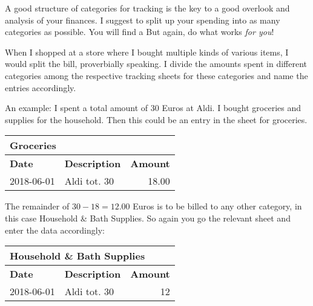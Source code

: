 A good structure of categories for tracking is the key to a good overlook and analysis of your finances.
I suggest to split up your spending into as many categories as possible.
You will find a 
But again, do what works \emph{for you}!

When I shopped at a store where I bought multiple kinds of various items, I would split the bill, proverbially speaking.
I divide the amounts spent in different categories among the respective tracking sheets for these categories and name the entries accordingly.

An example: I spent a total amount of 30 Euros at Aldi.
I bought groceries and supplies for the household.
Then this could be an entry in the sheet for groceries.
\begin{center}\sffamily
	\begin{tabular}{|l|l|r|}
		\multicolumn{3}{l}{Groceries}\\
		\hline
		\textbf{Date} & \textbf{Description} & \textbf{Amount}\rmfamily\\
		\hline
		2018-06-01 & Aldi tot. 30 & 18.00\\
		\hline
	\end{tabular}
\end{center}
The remainder of \( 30 - 18 = 12.00 \) Euros is to be billed to any other category, in this case Household \& Bath Supplies.
So again you go the relevant sheet and enter the data accordingly:
\begin{center}\sffamily
	\begin{tabular}{|l|l|r|}
		\multicolumn{3}{l}{Household \& Bath Supplies}\\			
		\hline
		\textbf{Date} & \textbf{Description} & \textbf{Amount}\\
		\hline
		2018-06-01 & Aldi tot. 30 & 12\\
		\hline
	\end{tabular}
\end{center}


